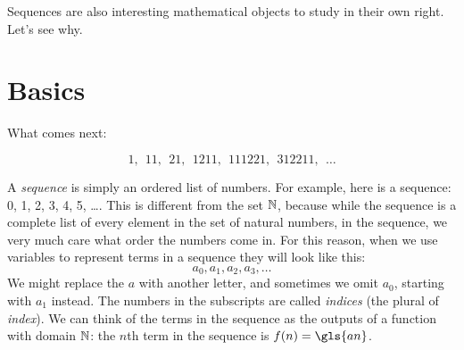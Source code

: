 \documentclass[12pt]{article}
\begin{document}
Sequences are also interesting mathematical objects to study in their own right. Let's see why.

\section{Basics}\label{sec:seq:basics}

\begin{activity}
What comes next:

\[1, ~~11, ~~21, ~~1211, ~~111221, ~~312211, ~~\ldots \]
\end{activity}

A \emph{sequence} is simply an ordered list of numbers.  For example, here is a sequence: 0, 1, 2, 3, 4, 5, \ldots.  This is different from the set $\mathbb N$, because while the sequence is a complete list of every element in the set of natural numbers, in the sequence, we very much care what order the numbers come in.  For this reason, when we use variables to represent terms in a sequence they will look like this:
\[a_0, a_1, a_2, a_3, \ldots\]
We might replace the $a$ with another letter, and sometimes we omit $a_0$, starting with $a_1$ instead.  The numbers in the subscripts are called {\em indices} (the plural of {\em index}).  We can think of the terms in the sequence as the outputs of a function with domain $\mathbb N$: the $n$th term in the sequence is $f(n) = \gls{an}$.
\end{document}
